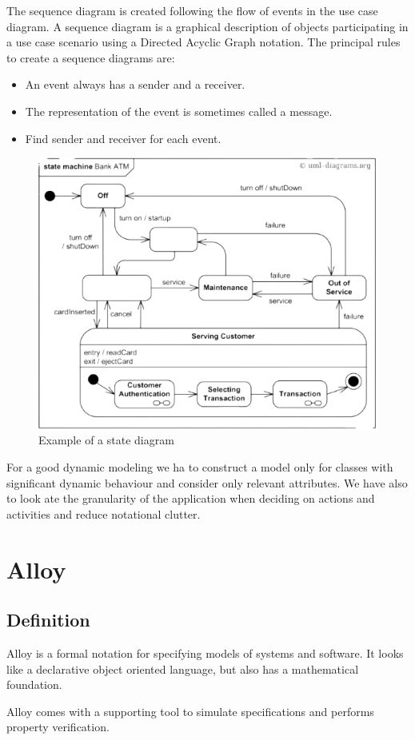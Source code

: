 \documentclass[12pt, a4paper]{report}
\newtheorem[style=M,bodystyle=\normalfont]{theorem}{Theorem}
\newtheorem[style=M,bodystyle=\normalfont]{corollary}{Corollary}
\newtheorem[style=M,bodystyle=\normalfont]{lemma}{Lemma}
\newtheorem[style=M,bodystyle=\normalfont]{definition}{Definition}
\begin{document}
    The sequence diagram is created following the flow of events in the use case diagram. A sequence diagram is a graphical description of objects participating in a use case 
    scenario using a Directed Acyclic Graph notation.
    The principal rules to create a sequence diagrams are: 
    \begin{itemize}
        \item An event always has a sender and a receiver.
        \item The representation of the event is sometimes called a message.
        \item Find sender and receiver for each event.
    \end{itemize}
    \begin{figure}[H]
        \centering
        \includegraphics[width=0.5\linewidth]{images/state.png}
        \caption{Example of a state diagram}
    \end{figure}
     
    For a good dynamic modeling we ha to construct a model only for classes with significant dynamic behaviour and consider only relevant attributes. We have also to look ate the
    granularity of the application when deciding on actions and activities and reduce notational clutter.

\newpage

\chapter{Alloy}
    \section{Definition}
        Alloy is a formal notation for specifying models of systems and software. It looks like a declarative object oriented language, but also has a mathematical foundation.
         
        Alloy comes with a supporting tool to simulate specifications and performs property verification.
         
\end{document}
